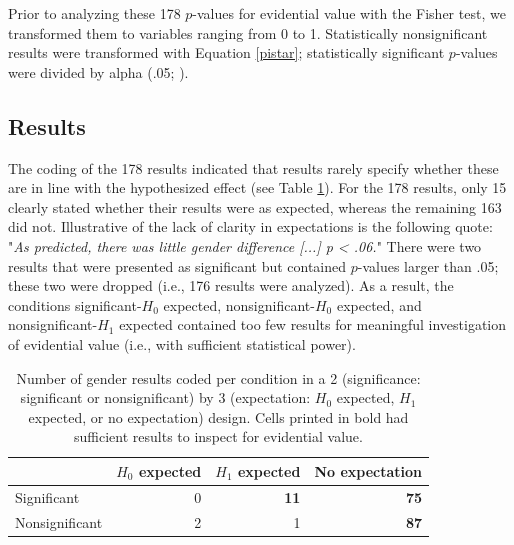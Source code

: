\documentclass{article}
\begin{document}
Prior to analyzing these 178 $p$-values for evidential value with the Fisher test, we transformed them to variables ranging from 0 to 1. Statistically nonsignificant results were transformed with Equation \ref{pistar}; statistically significant $p$-values were divided by alpha (.05; \cite{Van_Assen2015-gg,Simonsohn2014-dm}).

\subsection*{Results}


The coding of the 178 results indicated that results rarely specify whether these are in line with the hypothesized effect (see Table \ref{tab:tab5}). For the 178 results, only 15 clearly stated whether their results were as expected, whereas the remaining 163 did not. Illustrative of the lack of clarity in expectations is the following quote: "\textit{As predicted, there was little gender difference [...] p < .06.}" There were two results that were presented as significant but contained $p$-values larger than .05; these two were dropped (i.e., 176 results were analyzed). As a result, the conditions significant-$H_0$ expected, nonsignificant-$H_0$ expected, and nonsignificant-$H_1$ expected contained too few results for meaningful investigation of evidential value (i.e., with sufficient statistical power).

\begin{table}[htbp]
\caption{Number of gender results coded per condition in a 2 (significance: significant or nonsignificant) by 3 (expectation: $H_0$ expected, $H_1$ expected, or no expectation) design. Cells printed in bold had sufficient results to inspect for evidential value.}
\centering
\begin{tabular}{lrrr}
& $H_0$ expected & $H_1$ expected & No expectation \\
\hline
Significant    & 0           & \textbf{11}          & \textbf{75}             \\
Nonsignificant & 2           & 1           & \textbf{87}     \\
\hline
\end{tabular}
\label{tab:tab5}
\end{table}
\end{document}
